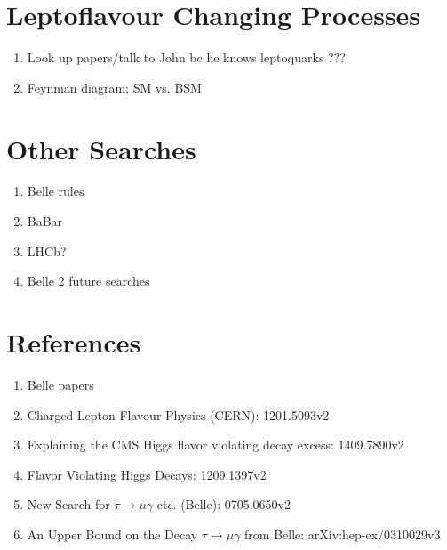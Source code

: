 \documentclass[a4paper]{article} %
\begin{document}
\section{Leptoflavour Changing Processes}
\begin{enumerate}
\item Look up papers/talk to John bc he knows leptoquarks ???
\item Feynman diagram; SM vs. BSM
\end{enumerate}

\section{Other Searches}
\begin{enumerate}
\item Belle rules
\item BaBar
\item LHCb?
\item Belle 2 future searches
\end{enumerate}

\section{References}
\begin{enumerate}
\item Belle papers
\item Charged-Lepton Flavour Physics (CERN): 1201.5093v2
\item Explaining the CMS Higgs flavor violating decay excess: 1409.7890v2
\item Flavor Violating Higgs Decays: 1209.1397v2
\item New Search for $\tau\to\mu\gamma$ etc. (Belle): 0705.0650v2
\item An Upper Bound on the Decay $\tau\to\mu\gamma$ from Belle: arXiv:hep-ex/0310029v3
\end{enumerate}





\pagebreak



\end{document}
